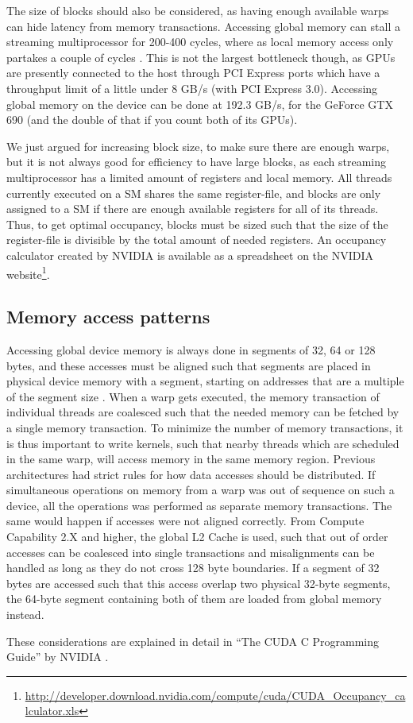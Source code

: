 The size of blocks should also be considered, as having enough
available warps can hide latency from memory transactions. Accessing
global memory can stall a streaming multiprocessor for 200-400 cycles,
where as local memory access only partakes a couple of cycles
\cite{nvidia2012cudaguide}. This is not the largest bottleneck though,
as GPUs are presently connected to the host through PCI Express ports
which have a throughput limit of a little under 8 GB/s (with PCI
Express 3.0). Accessing global memory on the device can be done at
192.3 GB/s, for the GeForce GTX 690 (and the double of that if you
count both of its GPUs).

We just argued for increasing block size, to make sure there are
enough warps, but it is not always good for efficiency to have large
blocks, as each streaming multiprocessor has a limited amount of
registers and local memory. All threads currently executed on a SM
shares the same register-file, and blocks are only assigned to a SM if
there are enough available registers for all of its threads. Thus, to
get optimal occupancy, blocks must be sized such that the size of the
register-file is divisible by the total amount of needed registers. An
occupancy calculator created by NVIDIA is available as a spreadsheet
on the NVIDIA
website\footnote{\url{http://developer.download.nvidia.com/compute/cuda/CUDA_Occupancy_calculator.xls}}.

\subsection{Memory access patterns}
Accessing global device memory is always done in segments of 32, 64 or
128 bytes, and these accesses must be aligned such that segments are
placed in physical device memory with a segment, starting on addresses
that are a multiple of the segment size
\cite{nvidia2012cudaguide}. When a warp gets executed, the memory
transaction of individual threads are coalesced such that the needed
memory can be fetched by a single memory transaction. To minimize the
number of memory transactions, it is thus important to write kernels,
such that nearby threads which are scheduled in the same warp, will
access memory in the same memory region. Previous architectures had
strict rules for how data accesses should be distributed. If
simultaneous operations on memory from a warp was out of sequence on
such a device, all the operations was performed as separate memory
transactions. The same would happen if accesses were not aligned
correctly. From Compute Capability 2.X and higher, the global L2 Cache
is used, such that out of order accesses can be coalesced into single
transactions and misalignments can be handled as long as they do not
cross 128 byte boundaries. If a segment of 32 bytes are accessed such
that this access overlap two physical 32-byte segments, the 64-byte
segment containing both of them are loaded from global memory instead.

These considerations are explained in detail in ``The CUDA C
Programming Guide'' by NVIDIA \cite[Section~5.3.2]{nvidia2012cudaguide}.

